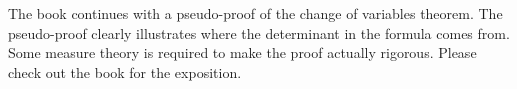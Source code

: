 \documentclass[11pt]{article}
\newcommand{\R}{\mathbf{R}}
\newcommand{\M}{\mathcal{M}}
\begin{document}
\begin{itemize}
\begin{itemize}
    \end{itemize}
\end{itemize}

The book continues with a pseudo-proof of the change of variables theorem. The pseudo-proof clearly illustrates where the determinant in the formula comes from. Some measure theory is required to make the proof actually rigorous. Please check out the book for the exposition.
\setcounter{secnumdepth}{3}
\end{document}
